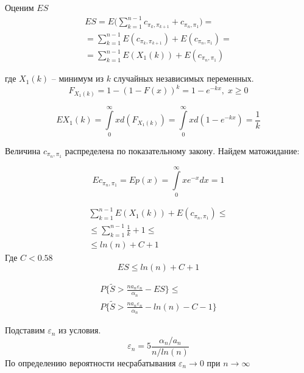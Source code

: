 \documentclass[a4paper, 14pt]{extarticle}
\numberwithin{equation}{section}
\begin{document}
Оценим $ES$
\begin{equation*}
\begin{aligned}
ES = E \Big( \sum_{k=1}^{n-1} c_{\pi_k, \pi_{k+1}} + c_{\pi_n, \pi_1} \Big) =\\
=  \sum_{k=1}^{n-1} E(c_{\pi_k, \pi_{k+1}}) + E(c_{\pi_n, \pi_1}) = \\
= \sum_{k=1}^{n-1} E(X_1(k)) + E(c_{\pi_n, \pi_1})
\end{aligned}
\end{equation*}

где $X_1(k)$ -- минимум из $k$ случайных независимых переменных.
\begin{equation*}
F_{X_1(k)} = 1 - (1-F(x))^k = 1 - e^{-kx}, \; x \geqslant 0
\end{equation*}

\begin{equation*}
EX_1(k) = \int\limits_0^\infty xd(F_{X_1(k)}) =\int\limits_0^\infty xd(1-e^{-kx}) = \frac{1}{k}
\end{equation*}

Величина $c_{\pi_n, \pi_1}$ распределена по показательному закону. Найдем матожидание:

\begin{equation*}
Ec_{\pi_n, \pi_1} = Ep(x) = \int\limits_0^\infty xe^{-x}dx = 1
\end{equation*}

\begin{equation*}
\begin{aligned}
\sum_{k=1}^{n-1} E(X_1(k)) + E(c_{\pi_n, \pi_1}) \leqslant \\
 \leqslant \sum_{k=1}^{n-1} \frac{1}{k} + 1 \leqslant \\
 \leqslant ln(n) + C + 1
\end{aligned}
\end{equation*}
Где $C < 0.58$
\begin{equation*}
ES \leqslant ln(n) + C + 1
\end{equation*}

\begin{equation*}
\begin{aligned}
P\{\tilde{S} >\frac{na_n\varepsilon_n}{\alpha_n} - ES  \} \leqslant \\
P\{\tilde{S} >\frac{na_n\varepsilon_n}{\alpha_n} - ln(n) - C - 1  \} \end{aligned}
\end{equation*}

Подставим $\varepsilon_n$ из условия.
\begin{equation*}
\varepsilon_n = 5 \frac{\alpha_n/a_n}{n/ln(n)}
\end{equation*}
По определению вероятности несрабатывания $\varepsilon_n \rightarrow 0$ при $n \rightarrow \infty$
\end{document}
